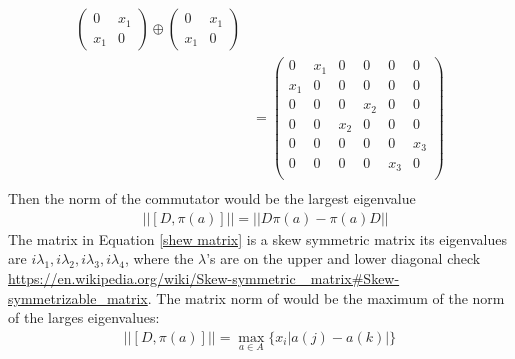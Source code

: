 \documentclass[a4paper]{article}
\newcounter{exercise}
\newenvironment{MyExercise}%
{\begin{mdframed}[style=exercisestyle]}{\end{mdframed}}
\theoremstyle{definition}
\theoremstyle{definition}
\theoremstyle{definition}
\theoremstyle{theorem}
\theoremstyle{theorem}
\begin{document}
\begin{MyExercise}
\begin{align}
        \begin{pmatrix}
            0 & x_1 \\ x_1 & 0
        \end{pmatrix} \oplus
        \begin{pmatrix}
            0 & x_1 \\ x_1 & 0
        \end{pmatrix} \nonumber \\
        &=
        \begin{pmatrix}
            0   & x_1 & 0 & 0 & 0 & 0 \\
            x_1 & 0   & 0 & 0 & 0 & 0 \\
            0   & 0   & 0 & x_2 & 0 & 0 \\
            0   & 0   & x_2 & 0 & 0 & 0 \\
            0   & 0   & 0 & 0 & 0 & x_3 \\
            0   & 0   & 0 & 0 & x_3 & 0 \\
        \end{pmatrix} \\
    \end{align}
    Then the norm of the commutator would be the largest eigenvalue
    \begin{align}
        &||[D, \pi(a)]|| = ||D\pi(a) - \pi(a)D||\nonumber
    \end{align}
The matrix in Equation \ref{shew matrix} is a skew symmetric matrix its eigenvalues
are $i\lambda_1, i\lambda_2, i\lambda_3, i\lambda_4$, where the $\lambda$'s are on the
upper and lower diagonal check \url{https://en.wikipedia.org/wiki/Skew-symmetric_
matrix#Skew-symmetrizable_matrix}. The matrix norm of would be the maximum of the norm of
the larges eigenvalues:
\begin{align}
    ||[D, \pi(a)]|| = \max_{a\in A}\{x_i|a(j)-a(k)|\}
\end{align}
\end{MyExercise}
\end{document}

